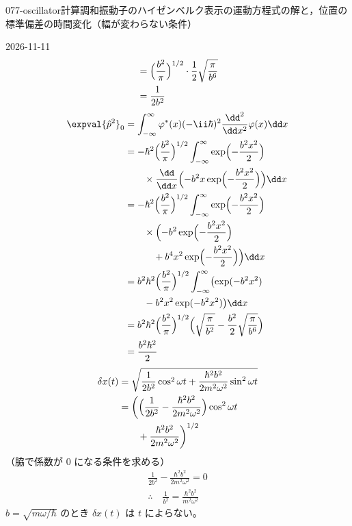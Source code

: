\documentclass[uplatex,dvipdfmx,a4paper,11pt]{jsarticle}
\begin{document}
\begin{mondai}{077-oscillator}{計算}{調和振動子のハイゼンベルク表示の運動方程式の解と，位置の標準偏差の時間変化（幅が変わらない条件）}
\begin{kotaeutsushi}{2026-11-11}
\begin{align*}
&=\Bigl(\frac{b^{2}}{\pi}\Bigr)^{1/2}\cdot\frac{1}{2}\sqrt{\frac{\pi}{b^{6}}}\\
&=\frac{1}{2b^{2}}
\end{align*}
\begin{align*}
\expval{\hat{p}^{2}}_{0}&=\int_{-\infty}^{\infty}\varphi^{*}(x)(-\ii\hbar)^{2}\frac{\dd^{2}}{\dd x^{2}}\varphi(x)\dd x\\
&=-\hbar^{2}\Bigl(\frac{b^{2}}{\pi}\Bigr)^{1/2}\int_{-\infty}^{\infty}\exp\Bigl(-\frac{b^{2}x^{2}}{2}\Bigr)\\
&\qquad\times\frac{\dd}{\dd x}\Bigl(-b^{2}x\exp\Bigl(-\frac{b^{2}x^{2}}{2}\Bigr)\Bigr)\dd x\\
&=-\hbar^{2}\Bigl(\frac{b^{2}}{\pi}\Bigr)^{1/2}\int_{-\infty}^{\infty}\exp\Bigl(-\frac{b^{2}x^{2}}{2}\Bigr)\\
&\qquad\times\Bigl(-b^{2}\exp\Bigl(-\frac{b^{2}x^{2}}{2}\Bigr)\\
&\qquad\quad+b^{4}x^{2}\exp\Bigl(-\frac{b^{2}x^{2}}{2}\Bigr)\Bigr)\dd x\\
&=b^{2}\hbar^{2}\Bigl(\frac{b^{2}}{\pi}\Bigr)^{1/2}\int_{-\infty}^{\infty}\bigl(\exp(-b^{2}x^{2})\\
&\qquad-b^{2}x^{2}\exp(-b^{2}x^{2})\bigr)\dd x\\
&=b^{2}\hbar^{2}\Bigl(\frac{b^{2}}{\pi}\Bigr)^{1/2}\Bigl(\sqrt{\frac{\pi}{b^{2}}}-\frac{b^{2}}{2}\sqrt{\frac{\pi}{b^{6}}}\Bigr)\\
&=\frac{b^{2}\hbar^{2}}{2}
\end{align*}
\begin{align*}
\delta x(t)&=\sqrt{\frac{1}{2b^{2}}\cos^{2}\omega t+\frac{\hbar^{2}b^{2}}{2m^{2}\omega^{2}}\sin^{2}\omega t}\\
&=\biggl(\Bigl(\frac{1}{2b^{2}}-\frac{\hbar^{2}b^{2}}{2m^{2}\omega^{2}}\Bigr)\cos^{2}\omega t\\
&\qquad+\frac{\hbar^{2}b^{2}}{2m^{2}\omega^{2}}\biggr)^{1/2}
\end{align*}
（脇で係数が $0$ になる条件を求める）
\begin{gather*}
\frac{1}{2b^{2}}-\frac{\hbar^{2}b^{2}}{2m^{2}\omega^{2}}=0\\
\therefore\quad\frac{1}{b^{2}}=\frac{\hbar^{2}b^{2}}{m^{2}\omega^{2}}
\end{gather*}
$b=\sqrt{m\omega/\hbar}$ のとき $\delta x(t)$ は $t$ によらない。


\end{kotaeutsushi}
\end{mondai}
\end{document}
